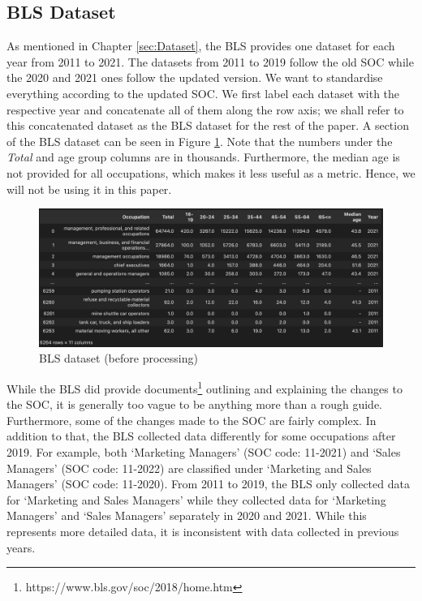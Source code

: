 \documentclass[11pt]{article}
\begin{document}
\subsection{BLS Dataset}
\label{subsec: BLS}
As mentioned in Chapter \ref{sec:Dataset}, the BLS provides one dataset for each year from 2011 to 2021. The datasets from 2011 to 2019 follow the old SOC while the 2020 and 2021 ones follow the updated version. We want to standardise everything according to the updated SOC. We first label each dataset with the respective year and concatenate  all of them along the row axis; we shall refer to this concatenated dataset as the BLS dataset for the rest of the paper. A section of the BLS dataset can be seen in Figure \ref{fig:df}. Note that the numbers under the \emph{Total} and age group columns are in thousands. Furthermore, the median age is not provided for all occupations, which makes it less useful as a metric. Hence, we will not be using it in this paper.

\begin{figure}[!htb]
    \centering
    \includegraphics[width=12cm]{Figures/BLS dataset (before).png}
    \caption{BLS dataset (before processing)}
	\label{fig:df}
\end{figure}

While the BLS did provide documents\footnote{https://www.bls.gov/soc/2018/home.htm} outlining and explaining the changes to the SOC, it is generally too vague to be anything more than a rough guide. Furthermore, some of the changes made to the SOC are fairly complex. In addition to that, the BLS collected data differently for some occupations after 2019. For example, both `Marketing Managers' (SOC code: 11-2021) and `Sales Managers' (SOC code: 11-2022) are classified under `Marketing and Sales Managers' (SOC code: 11-2020). From 2011 to 2019, the BLS only collected data for `Marketing and Sales Managers' while they collected data for `Marketing Managers' and `Sales Managers' separately in 2020 and 2021. While this represents more detailed data, it is inconsistent with data collected in previous years.
\end{document}
